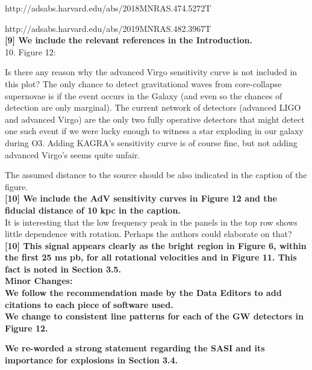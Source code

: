 \documentclass[11pt]{article}
\begin{document}
http://adsabs.harvard.edu/abs/2018MNRAS.474.5272T

http://adsabs.harvard.edu/abs/2019MNRAS.482.3967T\\

\textbf{[9] We include the relevant references in the Introduction.}\\

10. Figure 12:

Is there any reason why the advanced Virgo sensitivity curve is not included in this plot? The only chance to detect gravitational waves from core-collapse supernovae is  if the event occurs in the Galaxy (and even so the chances of detection are only marginal). The current network of detectors (advanced LIGO and advanced Virgo) are the only two fully operative detectors that might detect one such event if we were lucky enough to witness a star exploding in our galaxy during O3. Adding KAGRA's sensitivity curve is of course fine, but not adding advanced Virgo's seems quite unfair.

The assumed distance to the source should be also indicated in the caption of the 
figure.\\

\textbf{[10] We include the AdV sensitivity curves in Figure 12 and the fiducial distance of 10 kpc in the caption.}\\

It is interesting that the low frequency peak in the panels in the top row shows 
little dependence with rotation. Perhaps the authors could elaborate on that?\\

\textbf{[10] This signal appears clearly as the bright region in Figure 6, within the first 25 ms pb, for all rotational velocities and in Figure 11.  This fact is noted in Section 3.5.}\\

\textbf{Minor Changes:}\\

\textbf{We follow the recommendation made by the Data Editors to add citations to each piece of software used.}\\

\textbf{We change to consistent line patterns for each of the GW detectors in Figure 12.}

\textbf{We re-worded a strong statement regarding the SASI and its importance for explosions in Section 3.4.}

% 
%
% 
%
% 

\newpage

\setcounter{page}{1}  \renewcommand{\thepage}
           {Bibliography -- \arabic{page}}

\renewcommand\bibsection{\section*{References}}
\setlength{\bibsep}{2pt}

\end{document}
